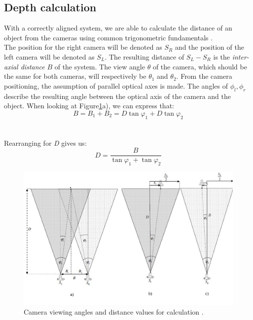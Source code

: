 \subsection{Depth calculation}
With a correctly aligned system, we are able to calculate the distance of an object from the cameras using common trigonometric fundamentals \cite{JernejMrovlje.2008,YasirDawoodSalman.2017}.
\\
The position for the right camera will be denoted as $S_{R}$ and the position of the left camera will be denoted as $S_{L}$. The resulting distance of $S_{L}-S_{R}$ is the \textit{inter-axial distance} $B$ of the system. The view angle $\theta$ of the camera, which should be the same for both cameras, will respectively be $\theta_{1}$ and $\theta_{2}$. From the camera positioning, the assumption of parallel optical axes is made. The angles of $\phi_{l},\phi_{r}$ describe the resulting angle between the optical axis of the camera and the object.
When looking at Figure\ref{stereo_Dimmensions}a), we can express that:\\
\begin{equation}
B= B_{1}+B_{2}=D\tan\varphi_{1}+D\tan\varphi_{2}
\end{equation}\\\\
Rearranging for \textit{D} gives us:\\
\begin{equation}
D = \frac{B}{\tan\varphi_{1}+\tan\varphi_{2}}
\end{equation}
\begin{figure}[H]
\includegraphics[width=\textwidth]{images/Stereo_Calc_4.JPG}
\caption{Camera viewing angles and distance values for calculation \cite{JernejMrovlje.2008}.}
\label{stereo_Dimmensions} 
\end{figure}
